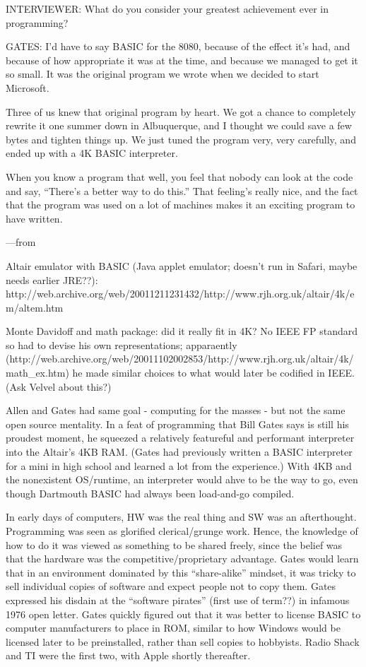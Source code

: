 \documentclass{article}
\begin{document}
INTERVIEWER: What do you consider your greatest achievement ever in programming?

GATES: I'd have to say BASIC for the 8080, because of the effect it's
had, and because of how appropriate it was at the time, and because we
managed to get it so small. It was the original program we wrote when we
decided to start Microsoft.

Three of us knew that original program by heart. We got a chance to
completely rewrite it one summer down in Albuquerque, and I thought we
could save a few bytes and tighten things up. We just tuned the program
very, very carefully, and ended up with a 4K BASIC interpreter.

When you know a program that well, you feel that nobody can look at the
code and say, ``There's a better way to do this.'' That feeling's really
nice, and the fact that the program was used on a lot of machines makes
it an exciting program to have written.

---from \cite{programmers_at_work}

Altair emulator with BASIC (Java applet emulator; doesn't run in Safari,
maybe needs earlier JRE??): 
http://web.archive.org/web/20011211231432/http://www.rjh.org.uk/altair/4k/em/altem.htm

Monte Davidoff and math package: did it really fit in 4K?  No IEEE FP
standard so had to devise his own representations; apparaently
(http://web.archive.org/web/20011102002853/http://www.rjh.org.uk/altair/4k/math\_ex.htm)
he made similar choices to what would later be codified in IEEE.  (Ask
Velvel about this?)

Allen and Gates had same goal - computing for the masses - but not the
same open source mentality.  In a feat of programming that Bill Gates
says is still his proudest moment, he squeezed a relatively featureful
and performant interpreter into the Altair's 4KB RAM.  (Gates had
previously written a BASIC interpreter for  a mini in high school and
learned a lot from the experience.)  With 4KB and the nonexistent
OS/runtime, an interpreter would ahve to be the way to go, even though
Dartmouth BASIC had always been load-and-go compiled.

In early days of computers, HW was the real thing and SW was an
afterthought.  Programming was seen as glorified clerical/grunge work.
Hence, the knowledge of how to do it was viewed as something to be
shared freely, since the belief was that the hardware was the
competitive/proprietary advantage.
Gates would learn that in an environment dominated by this
``share-alike'' mindset, it was
tricky to sell individual copies of software and expect people not to
copy them.  Gates
expressed his disdain at the ``software pirates'' (first use of term??) in infamous
1976 open letter.
Gates quickly figured out that it was better to license BASIC to
computer manufacturers to place in ROM, similar to how Windows would be
licensed later to be preinstalled, rather than sell copies to
hobbyists.  Radio Shack and TI were the first two, with Apple shortly
thereafter.  
\end{document}
